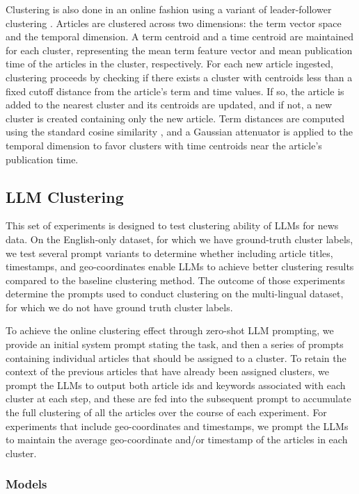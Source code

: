 Clustering is also done in an online fashion using a variant of leader-follower clustering \cite{Duda73}. 
Articles are clustered across two dimensions: the term vector space and the temporal dimension. 
A term centroid and a time centroid are maintained for each cluster, representing the mean term feature vector and mean publication time of the articles in the cluster, respectively. 
For each new article ingested, clustering proceeds by checking if there exists a cluster with centroids less than a fixed cutoff distance from the article's term and time values. 
If so, the article is added to the nearest cluster and its centroids are updated, and if not, a new cluster is created containing only the new article. 
Term distances are computed using the standard cosine similarity \cite{steinbach}, and a Gaussian attenuator is applied to the temporal dimension to favor clusters with time centroids near the article's publication time.



\subsection{LLM Clustering}

This set of experiments is designed to test clustering ability of LLMs for news data.
On the English-only dataset, for which we have ground-truth cluster labels, we test several prompt variants to determine whether including article titles, timestamps, and geo-coordinates enable LLMs to achieve better clustering results compared to the baseline clustering method.
The outcome of those experiments determine the prompts used to conduct clustering on the multi-lingual dataset, for which we do not have ground truth cluster labels.

To achieve the online clustering effect through zero-shot LLM prompting, we provide an initial system prompt stating the task, and then a series of prompts containing individual articles that should be assigned to a cluster.
To retain the context of the previous articles that have already been assigned clusters, we prompt the LLMs to output both article ids and keywords associated with each cluster at each step, and these are fed into the subsequent prompt to accumulate the full clustering of all the articles over the course of each experiment.
For experiments that include geo-coordinates and timestamps, we prompt the LLMs to maintain the average geo-coordinate and/or timestamp of the articles in each cluster.

\subsubsection{Models}

